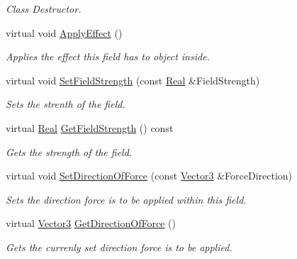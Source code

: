\begin{DoxyCompactItemize}
\begin{DoxyCompactList}\small\item\em Class Destructor. \item\end{DoxyCompactList}\item 
virtual void \hyperlink{classphys_1_1FieldOfForce_a625da808c9e77eafa47553854dc61c0c}{ApplyEffect} ()
\begin{DoxyCompactList}\small\item\em Applies the effect this field has to object inside. \item\end{DoxyCompactList}\item 
virtual void \hyperlink{classphys_1_1FieldOfForce_ad7d83cc9b16a8a735051cf991c893d71}{SetFieldStrength} (const \hyperlink{namespacephys_af7eb897198d265b8e868f45240230d5f}{Real} \&FieldStrength)
\begin{DoxyCompactList}\small\item\em Sets the strenth of the field. \item\end{DoxyCompactList}\item 
virtual \hyperlink{namespacephys_af7eb897198d265b8e868f45240230d5f}{Real} \hyperlink{classphys_1_1FieldOfForce_a28bc735f6a0b3d2e1851e66d6877a041}{GetFieldStrength} () const 
\begin{DoxyCompactList}\small\item\em Gets the strength of the field. \item\end{DoxyCompactList}\item 
virtual void \hyperlink{classphys_1_1FieldOfForce_a3236fd171fd1998e0f4b30e5440e88bc}{SetDirectionOfForce} (const \hyperlink{classphys_1_1Vector3}{Vector3} \&ForceDirection)
\begin{DoxyCompactList}\small\item\em Sets the direction force is to be applied within this field. \item\end{DoxyCompactList}\item 
virtual \hyperlink{classphys_1_1Vector3}{Vector3} \hyperlink{classphys_1_1FieldOfForce_a1c0ad14cd3b9dc76157ca50e7e26327e}{GetDirectionOfForce} ()
\begin{DoxyCompactList}\small\item\em Gets the currenly set direction force is to be applied. \item\end{DoxyCompactList}\item 

\end{DoxyCompactItemize}
